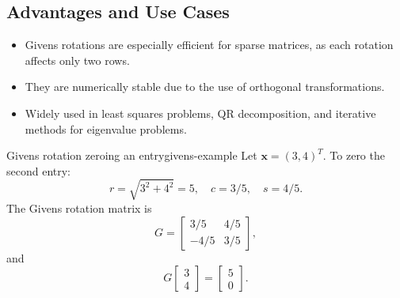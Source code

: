 \subsection{Advantages and Use Cases}
\begin{itemize}
    \item Givens rotations are especially efficient for sparse matrices, as each rotation affects only two rows.
    \item They are numerically stable due to the use of orthogonal transformations.
    \item Widely used in least squares problems, QR decomposition, and iterative methods for eigenvalue problems.
\end{itemize}

\begin{example}{Givens rotation zeroing an entry}{givens-example}
    Let $\mathbf{x} = (3, 4)^T$. To zero the second entry:
    \[
        r = \sqrt{3^2 + 4^2} = 5, \quad c = 3/5, \quad s = 4/5.
    \]
    The Givens rotation matrix is
    \[
        G = \begin{bmatrix}
            3/5  & 4/5 \\
            -4/5 & 3/5
        \end{bmatrix},
    \]
    and
    \[
        G \begin{bmatrix} 3 \\ 4 \end{bmatrix} = \begin{bmatrix} 5 \\ 0 \end{bmatrix}.
    \]
\end{example}
